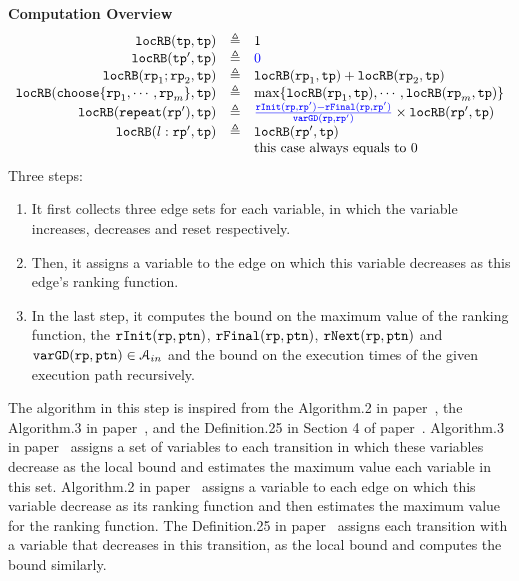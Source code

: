 \textbf{Computation Overview}
\[
  \begin{array}{rcl}
    \outinB(\tpath, \tpath) & \triangleq & 1 \\
    \outinB(\tpath', \tpath) & \triangleq & \highlight{0} \\
    \outinB(\rprog_1;\rprog_2, \tpath) & \triangleq & \outinB(\rprog_1, \tpath) + \outinB(\rprog_2, \tpath) \\
    \outinB(\rpchoose{\rprog_1, \cdots, \rprog_m }, \tpath) & \triangleq 
    & \max\left\{ \outinB(\rprog_1, \tpath), \cdots, \outinB(\rprog_m, \tpath) \right\} \\
    \outinB(\rprepeat(\rprog'), \tpath) & \triangleq 
    & \highlight{\frac{\rfinit(\rprog, \rprog') - \rffinal(\rprog, \rprog')}{\varGD(\rprog, \rprog')}}
     \times \outinB(\rprog', \tpath)
     \\
    \outinB(l: \rprog', \tpath) & \triangleq & \outinB(\rprog', \tpath) \\
    &  & \text{this case always equals to } 0 \\
  \end{array}\]
Three steps:
\begin{enumerate}
    \item It first collects three edge sets for each variable,
  in which the variable increases, decreases and reset respectively.
  \item
  Then, it assigns a variable to the edge on which this variable decreases as this edge's ranking function.
  \item
  In the last step, it computes the bound on the maximum value of the ranking function,
  the $\mathtt{rInit}(\mathtt{rp}, \mathtt{ptn})$,
  $\mathtt{rFinal}(\mathtt{rp}, \mathtt{ptn})$, $\mathtt{rNext}(\mathtt{rp}, \mathtt{ptn})$ and $\mathtt{varGD}(\mathtt{rp}, \mathtt{ptn}) \in \mathcal{A}_{in}$
   and the bound on the execution
  times of the given execution path recursively.
  \end{enumerate}

  The algorithm in this step is inspired from the Algorithm.2 in paper~\cite{SinnZV14},
  the Algorithm.3 in paper~\cite{ZulegerGSV11},
  and the Definition.25 in Section 4 of paper~\cite{sinn2017complexity}.
  Algorithm.3 in paper~\cite{ZulegerGSV11} assigns a set of variables to each transition in which these variables decrease as the local bound
  and estimates the maximum value each variable in this set.
  Algorithm.2 in paper~\cite{SinnZV14} assigns a variable to each edge on which this variable decrease as its ranking function
  and then estimates the maximum value for the ranking function.
  The Definition.25 in paper~\cite{sinn2017complexity}
  assigns each transition with a variable that decreases in this transition, as the local bound and computes the bound similarly.

